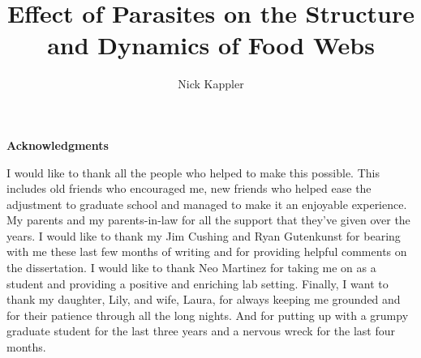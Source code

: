 \documentclass[11pt,letterpaper,twoside,notitlepage]{report}
\title{Effect of Parasites on the Structure and Dynamics of Food Webs}
\author{Nick Kappler}
\begin{document}
\bibliographyunit[\chapter]


    \newpage
    \thispagestyle{plain}
    \setcounter{page}{2}

    

 


\begin{center}
{\Large\textbf{Acknowledgments}} 
\end{center} 

I would like to thank all the people who helped to make this possible. This
includes old friends who encouraged me, new friends who helped ease the
adjustment to graduate school and managed to make it an enjoyable experience.
My parents and my parents-in-law for all the support that they've given over
the years. I would like to thank my Jim Cushing and Ryan Gutenkunst for bearing
with me these last few months of writing and for providing helpful comments on
the dissertation. I would like to thank Neo Martinez for taking me on as a
student and providing a positive and enriching lab setting. Finally, I want to
thank my daughter, Lily, and wife, Laura, for always keeping me grounded and
for their patience through all the long nights. And for putting up with a
grumpy graduate student for the last three years and a nervous wreck for the
last four months.

 
\tableofcontents
\listoffigures


\listoftables


\newpage
\end{document}
